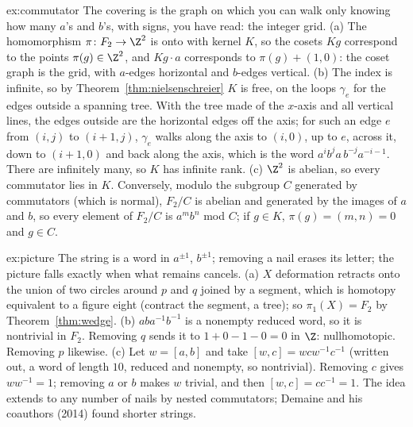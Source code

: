 \begin{solution}{ex:commutator}
\idea The covering is the graph on which you can walk only knowing how many $a$'s and $b$'s, with signs, you have read: the integer grid.
\writeup (a) The homomorphism $\pi\colon F_2\to\Z^2$ is onto with kernel $K$, so the cosets $Kg$ correspond to the points $\pi(g)\in\Z^2$, and $Kg\cdot a$ corresponds to $\pi(g)+(1,0)$: the coset graph is the grid,
with $a$-edges horizontal and $b$-edges vertical. (b) The index is infinite, so by Theorem~\ref{thm:nielsenschreier} $K$ is free, on the loops $\gamma_e$ for the edges outside a spanning tree. With the
tree made of the $x$-axis and all vertical lines, the edges outside are the horizontal edges off the axis; for such an edge $e$ from $(i,j)$ to $(i+1,j)$, $\gamma_e$ walks along the axis to $(i,0)$, up to $e$, across it, down to $(i+1,0)$
and back along the axis, which is the word $a^ib^ja\,b^{-j}a^{-i-1}$. There are infinitely many, so $K$ has infinite rank. (c) $\Z^2$ is abelian, so every
commutator lies in $K$. Conversely, modulo the subgroup $C$ generated by commutators (which is normal), $F_2/C$ is abelian and generated by the images of $a$ and $b$, so every element of
$F_2/C$ is $a^mb^n$ mod $C$; if $g\in K$, $\pi(g)=(m,n)=0$ and $g\in C$.
\end{solution}

\begin{solution}{ex:picture}
\idea The string is a word in $a^{\pm1}$, $b^{\pm1}$; removing a nail erases its letter; the picture falls exactly when what remains cancels.
\writeup (a) $X$ deformation retracts onto the union of two circles around $p$ and $q$ joined by a segment, which is homotopy equivalent to a figure eight (contract the segment, a tree); so
$\pi_1(X)=F_2$ by Theorem~\ref{thm:wedge}. (b) $aba^{-1}b^{-1}$ is a nonempty reduced word, so it is nontrivial in $F_2$. Removing $q$ sends it to $1+0-1-0=0$ in $\Z$: nullhomotopic. Removing $p$
likewise. (c) Let $w=[a,b]$ and take $[w,c]=wcw^{-1}c^{-1}$ (written out, a word of length $10$, reduced and nonempty, so nontrivial). Removing $c$ gives $ww^{-1}=1$; removing $a$ or $b$ makes $w$
trivial, and then $[w,c]=cc^{-1}=1$. The idea extends to any number of nails by nested commutators; Demaine and his coauthors (2014) found shorter strings.
\end{solution}

